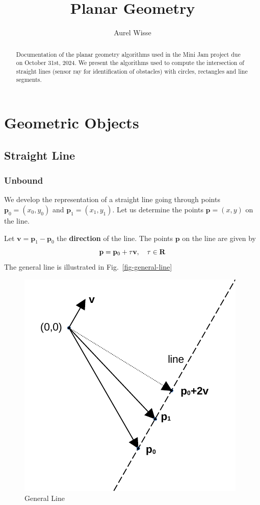 \documentclass[11pt]{article}
\newcommand{\pb}{\mathbf{p}}
\newcommand{\Rb}{\mathbf{R}}
\newcommand{\vb}{\mathbf{v}}
\newcommand{\figref}[1]{Fig.~\eqref{#1}}
\begin{document}
%
%
\title{Planar Geometry}
\author{Aurel Wisse}
\maketitle
%
%
\begin{abstract}
Documentation of the planar geometry algorithms used in the
Mini Jam project due on October 31st, 2024. We present the algorithms used to
compute the intersection of straight lines (sensor ray for identification
of obstacles) with circles, rectangles and line segments.
\end{abstract}
%
\pagebreak
\tableofcontents
\listoftables
\listoffigures
\pagebreak
%
\section{Geometric Objects}
\label{sec-geometric-objects}
\subsection{Straight Line}
\label{sec-straight-line}

\subsubsection{Unbound}
\label{sec-line-unbound}
We develop the representation of a straight line going through
points $\pb_0=(x_0, y_0)$ and $\pb_1=(x_1, y_1)$.
Let us determine the points $\pb=(x, y)$ on the line.

Let $\vb=\pb_1-\pb_0$ the {\bf direction} of the line. The points $\pb$ on the
line are given by
\begin{equation}
    \pb=\pb_0 + \tau \vb,\quad \tau\in\Rb \label{eq-line-general} \\
\end{equation}
The general line is illustrated in \figref{fig-general-line}
\begin{figure}
    \centering
    \includegraphics{odg/general-line.pdf}
    \caption{General Line}\label{fig-general-line}
\end{figure}
\end{document}
